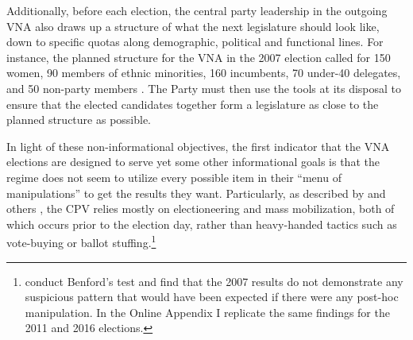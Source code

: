 \documentclass[12pt]{article}
\newcommand{\1}{\mathbbm{1}}
\begin{document}
Additionally, before each election, the central party leadership in the outgoing VNA also draws up a structure of what the next legislature should look like, down to specific quotas along demographic, political and functional lines. For instance, the planned structure for the VNA in the 2007 election called for 150 women, 90 members of ethnic minorities, 160 incumbents, 70 under-40 delegates, and 50 non-party members \citep[506]{MaleskySchuler2011}. The Party must then use the tools at its disposal to ensure that the elected candidates together form a legislature as close to the planned structure as possible.

In light of these non-informational objectives, the first indicator that the VNA elections are designed to serve yet some other informational goals is that the regime does not seem to utilize every possible item in their ``menu of manipulations'' \citep[to quote][]{Schedler2002menu} to get the results they want. Particularly, as described by \citet{MaleskySchuler2011} and others \citep[e.g][]{Gainsborough2005}, the CPV relies mostly on electioneering and mass mobilization, both of which occurs prior to the election day, rather than heavy-handed tactics such as vote-buying or ballot stuffing.\footnote{\citet{MaleskySchuler2011} conduct Benford's test and find that the 2007 results do not demonstrate any suspicious pattern that would have been expected if there were any post-hoc manipulation. In the Online Appendix I replicate the same findings for the 2011 and 2016 elections.}
\end{document}
